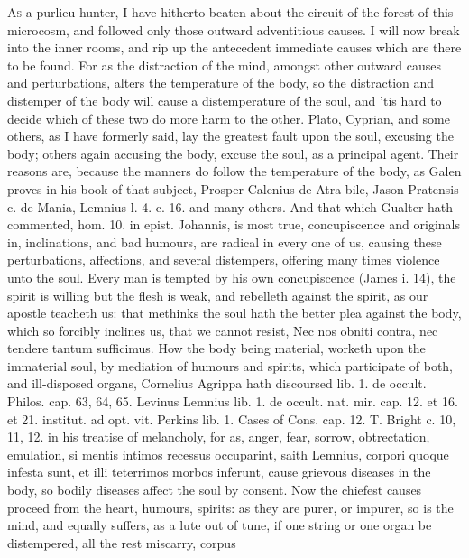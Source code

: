 {\lettrine{A}{s} a purlieu hunter, I have hitherto beaten about the circuit of the
forest of this microcosm, and followed only those outward adventitious
causes. I will now break into the inner rooms, and rip up the
antecedent immediate causes which are there to be found. For as the
distraction of the mind, amongst other outward causes and
perturbations, alters the temperature of the body, so the distraction
and distemper of the body will cause a distemperature of the soul, and
'tis hard to decide which of these two do more harm to the other.
Plato, Cyprian, and some others, as I have formerly said, lay the
greatest fault upon the soul, excusing the body; others again accusing
the body, excuse the soul, as a principal agent. Their reasons are,
because the manners do follow the temperature of the body, as
Galen proves in his book of that subject, Prosper Calenius de Atra
bile, Jason Pratensis c. de Mania, Lemnius l. 4. c. 16. and many
others. And that which Gualter hath commented, hom. 10. in epist.
Johannis, is most true, concupiscence and originals in, inclinations,
and bad humours, are radical in every one of us, causing these
perturbations, affections, and several distempers, offering many times
violence unto the soul. Every man is tempted by his own concupiscence
(James i. 14), the spirit is willing but the flesh is weak, and
rebelleth against the spirit, as our apostle teacheth us: that
methinks the soul hath the better plea against the body, which so
forcibly inclines us, that we cannot resist, Nec nos obniti contra, nec
tendere tantum sufficimus. How the body being material, worketh upon
the immaterial soul, by mediation of humours and spirits, which
participate of both, and ill-disposed organs, Cornelius Agrippa hath
discoursed lib. 1. de occult. Philos. cap. 63, 64, 65. Levinus Lemnius
lib. 1. de occult. nat. mir. cap. 12. et 16. et 21. institut. ad opt.
vit. Perkins lib. 1. Cases of Cons. cap. 12. T. Bright c. 10, 11, 12.
in his treatise of melancholy, for as,  anger, fear, sorrow,
obtrectation, emulation, \etc{} si mentis intimos recessus occuparint,
saith Lemnius, corpori quoque infesta sunt, et illi teterrimos
morbos inferunt, cause grievous diseases in the body, so bodily
diseases affect the soul by consent. Now the chiefest causes proceed
from the heart, humours, spirits: as they are purer, or impurer,
so is the mind, and equally suffers, as a lute out of tune, if one
string or one organ be distempered, all the rest miscarry, corpus
}
